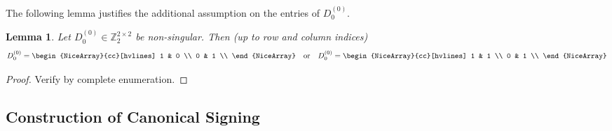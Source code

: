\documentclass{article}
\newtheorem{lemma}{Lemma}
\theoremstyle{definition}
\begin{document}
The following lemma justifies the additional assumption on the entries of $D_{0}^{(0)}$.

\begin{lemma}\label{lem:matrix_z2_2_2_rank_2}
    Let $D_{0}^{(0)} \in \mathbb{Z}_{2}^{2 \times 2}$ be non-singular. Then (up to row and column indices)
    \[
        D_{0}^{(0)} = \begin{NiceArray}{cc}[hvlines] 1 & 0 \\ 0 & 1 \\ \end{NiceArray}
        \quad \text{or} \quad
        D_{0}^{(0)} = \begin{NiceArray}{cc}[hvlines] 1 & 1 \\ 0 & 1 \\ \end{NiceArray}
    \]
\end{lemma}

\begin{proof}
    Verify by complete enumeration.
\end{proof}

\subsection{Construction of Canonical Signing}
\end{document}

